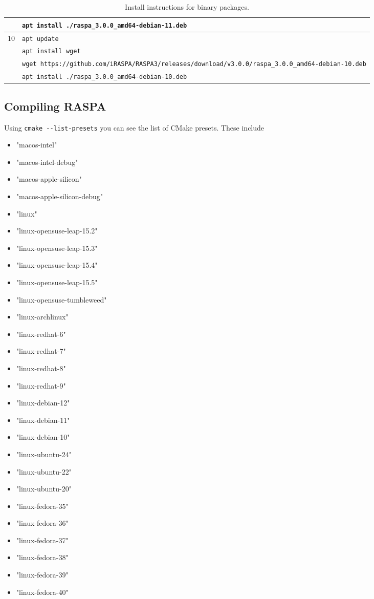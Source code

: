 \begin{table}[p]
\begin{tabularx}{\linewidth}{c|X}
     & \verb+apt install ./raspa_3.0.0_amd64-debian-11.deb+\\
     \hline
  10 & \verb+apt update+\\
     & \verb+apt install wget+\\
     & \verb+wget https://github.com/iRASPA/RASPA3/releases/download/v3.0.0/raspa_3.0.0_amd64-debian-10.deb+\\
     & \verb+apt install ./raspa_3.0.0_amd64-debian-10.deb+\\
  \end{tabularx}
  \caption{Install instructions for binary packages.}
\end{table}

\subsection{Compiling RASPA}

Using \verb+cmake --list-presets+ you can see the list of CMake presets.
These include
\begin{itemize}
  \item{"macos-intel"}
  \item{"macos-intel-debug"}
  \item{"macos-apple-silicon"}
  \item{"macos-apple-silicon-debug"}
  \item{"linux"}
  \item{"linux-opensuse-leap-15.2"}
  \item{"linux-opensuse-leap-15.3"}
  \item{"linux-opensuse-leap-15.4"}
  \item{"linux-opensuse-leap-15.5"}
  \item{"linux-opensuse-tumbleweed"}
  \item{"linux-archlinux"}
  \item{"linux-redhat-6"}
  \item{"linux-redhat-7"}
  \item{"linux-redhat-8"}
  \item{"linux-redhat-9"}
  \item{"linux-debian-12"}
  \item{"linux-debian-11"}
  \item{"linux-debian-10"}
  \item{"linux-ubuntu-24"}
  \item{"linux-ubuntu-22"}
  \item{"linux-ubuntu-20"}
  \item{"linux-fedora-35"}
  \item{"linux-fedora-36"}
  \item{"linux-fedora-37"}
  \item{"linux-fedora-38"}
  \item{"linux-fedora-39"}
  \item{"linux-fedora-40"}
\end{itemize}

